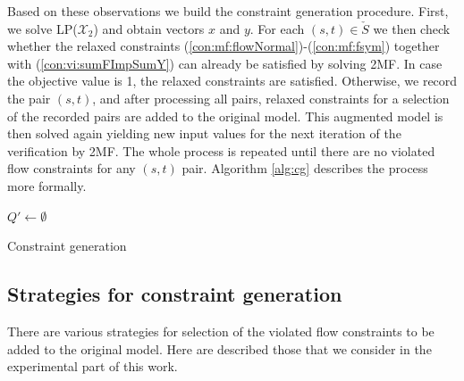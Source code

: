 Based on these observations we build the constraint generation procedure.
First, we solve LP($\mathcal{X}_2$) and obtain vectors $x$ and $y$.
For each $(s,t)\in \check{S}$ we then check whether the relaxed constraints (\ref{con:mf:flowNormal})-(\ref{con:mf:fsym}) together with (\ref{con:vi:sumFImpSumY}) can already be satisfied by solving 2MF.
In case the objective value is 1, the relaxed constraints are satisfied.
Otherwise, we record the pair $(s,t)$, and after processing all pairs, relaxed constraints for a selection of the recorded pairs are added to the original model.
This augmented model is then solved again yielding new input values for the next iteration of the verification by 2MF.
The whole process is repeated until there are no violated flow constraints for any $(s,t)$ pair.
Algorithm \ref{alg:cg} describes the process more formally.

\begin{algorithm}
$Q'\leftarrow\emptyset$
 ~\newline
 \caption{Constraint generation}
\label{alg:cg}
\end{algorithm}

\subsection{Strategies for constraint generation}

There are various strategies for selection of the violated flow constraints to be added to the original model.
Here are described those that we consider in the experimental part of this work.

